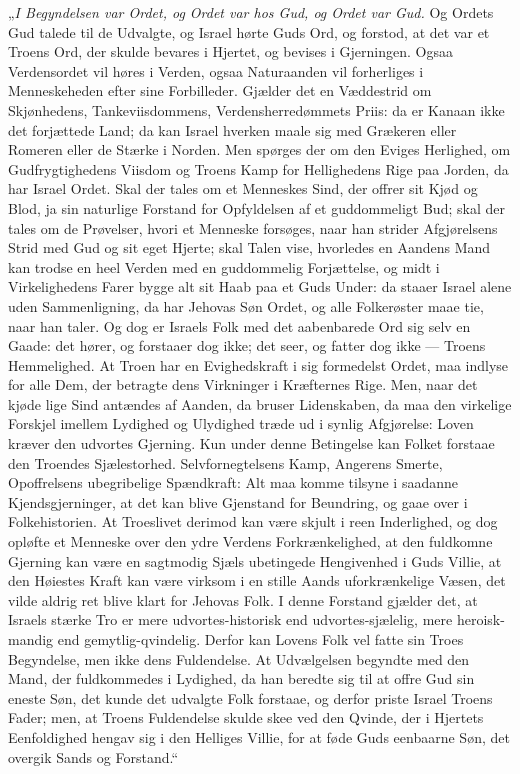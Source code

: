\documentclass[12pt,a4paper]{book}
\begin{document}
„\emph{I Begyndelsen var Ordet, og Ordet var hos Gud, og Ordet var Gud.} Og
Ordets Gud talede til de Udvalgte, og Israel hørte Guds Ord, og forstod, at det
var et Troens Ord, der skulde bevares i Hjertet, og bevises i Gjerningen. Ogsaa
Verdensordet vil høres i Verden, ogsaa Naturaanden vil forherliges i
Menneskeheden efter sine Forbilleder. Gjælder det en Væddestrid om Skjønhedens,
Tankeviisdommens, Verdensherredømmets Priis: da er Kanaan ikke det forjættede
Land; da kan Israel hverken maale sig med Grækeren eller Romeren eller de Stærke
i Norden. Men spørges der om den Eviges Herlighed, om Gudfrygtighedens Viisdom
og Troens Kamp for Hellighedens Rige paa Jorden, da har Israel Ordet. Skal der
tales om et Menneskes Sind, der offrer sit Kjød og Blod, ja sin naturlige
Forstand for Opfyldelsen af et guddommeligt Bud; skal der tales om de Prøvelser,
hvori et Menneske forsøges, naar han strider Afgjørelsens Strid med Gud og sit
eget Hjerte; skal Talen vise, hvorledes en Aandens Mand kan trodse en heel
Verden med en guddommelig Forjættelse, og midt i Virkelighedens Farer bygge alt
sit Haab paa et Guds Under: da staaer Israel alene uden Sammenligning, da har
Jehovas Søn Ordet, og alle Folkerøster maae tie, naar han taler. Og dog er
Israels Folk med det aabenbarede Ord sig selv en Gaade: det hører, og forstaaer
dog ikke; det seer, og fatter dog ikke --- Troens Hemmelighed. At Troen har en
Evighedskraft i sig formedelst Ordet, maa indlyse for alle Dem, der betragte
dens Virkninger i Kræfternes Rige. Men, naar det kjøde\-%
lige Sind antændes af Aanden, da bruser Lidenskaben, da maa den virkelige
Forskjel imellem Lydighed og Ulydighed træde ud i synlig Afgjørelse: Loven
kræver den udvortes Gjerning. Kun under denne Betingelse kan Folket forstaae den
Troendes Sjælestorhed. Selvfornegtelsens Kamp, Angerens Smerte, Opoffrelsens
ubegribelige Spændkraft: Alt maa komme tilsyne i saadanne Kjendsgjerninger, at
det kan blive Gjenstand for Beundring, og gaae over i Folkehistorien. At
Troeslivet derimod kan være skjult i reen Inderlighed, og dog opløfte et
Menneske over den ydre Verdens Forkrænkelighed, at den fuldkomne Gjerning kan
være en sagtmodig Sjæls ubetingede Hengivenhed i Guds Villie, at den Høiestes
Kraft kan være virksom i en stille Aands uforkrænkelige Væsen, det vilde aldrig
ret blive klart for Jehovas Folk. I denne Forstand gjælder det, at Israels
stærke Tro er mere udvortes-historisk end udvortes-sjælelig, mere
heroisk-mandig end gemytlig-qvindelig. Derfor kan Lovens Folk vel fatte sin
Troes Begyndelse, men ikke dens Fuldendelse. At Udvælgelsen begyndte med den
Mand, der fuldkommedes i Lydighed, da han beredte sig til at offre Gud sin
eneste Søn, det kunde det udvalgte Folk forstaae, og derfor priste Israel Troens
Fader; men, at Troens Fuldendelse skulde skee ved den Qvinde, der i Hjertets
Eenfoldighed hengav sig i den Helliges Villie, for at føde Guds eenbaarne Søn,
det overgik Sands og Forstand.“
\end{document}
